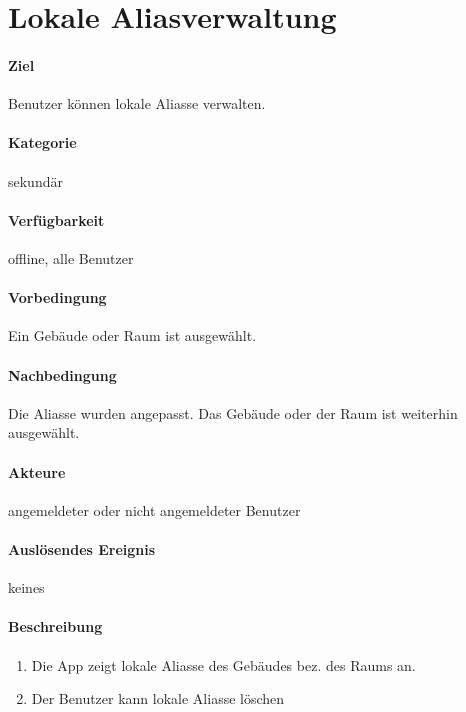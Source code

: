 \section{Lokale Aliasverwaltung}
\label{Lokale_Aliasverwaltung}
\paragraph{Ziel}
Benutzer können lokale Aliasse verwalten.
\paragraph{Kategorie}
sekundär
\paragraph{Verfügbarkeit}
offline, alle Benutzer
\paragraph{Vorbedingung}
Ein Gebäude oder Raum ist ausgewählt.
\paragraph{Nachbedingung}
Die Aliasse wurden angepasst. Das Gebäude oder der Raum ist weiterhin ausgewählt.
\paragraph{Akteure}
angemeldeter oder nicht angemeldeter Benutzer
\paragraph{Auslösendes Ereignis} keines
\paragraph{Beschreibung}
\begin{enumerate}
      \item Die App zeigt lokale Aliasse des Gebäudes bez. des Raums an.
      \item Der Benutzer kann lokale Aliasse löschen
\end{enumerate}
